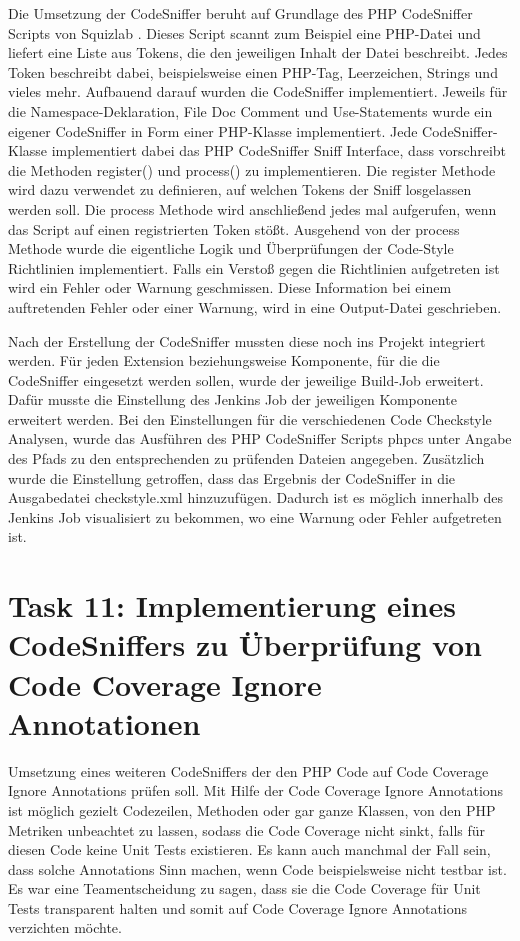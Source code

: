 \documentclass[11pt,a4paper]{article} %
\begin{document}
Die Umsetzung der CodeSniffer beruht auf Grundlage des PHP CodeSniffer Scripts von Squizlab 
\cite{SquizlabPHPCodeSniffer}. Dieses Script scannt zum Beispiel eine PHP-Datei und liefert
eine Liste aus Tokens, die den jeweiligen Inhalt der Datei beschreibt. Jedes Token beschreibt dabei,
beispielsweise einen PHP-Tag, Leerzeichen, Strings und vieles mehr. Aufbauend darauf
wurden die CodeSniffer implementiert. Jeweils für die Namespace-Deklaration, File Doc Comment
und Use-Statements wurde ein eigener CodeSniffer in Form einer PHP-Klasse implementiert.
Jede CodeSniffer-Klasse implementiert dabei das PHP CodeSniffer Sniff Interface, dass vorschreibt
die Methoden register() und process() zu implementieren. Die register Methode wird dazu 
verwendet zu definieren, auf welchen Tokens der Sniff losgelassen werden soll.
Die process Methode wird anschließend jedes mal aufgerufen, wenn das Script auf einen registrierten
Token stößt. Ausgehend von der process Methode wurde die eigentliche Logik und Überprüfungen
der Code-Style Richtlinien implementiert. Falls ein Verstoß gegen die Richtlinien 
aufgetreten ist wird ein Fehler oder Warnung geschmissen.
Diese Information bei einem auftretenden Fehler oder einer Warnung, wird in eine Output-Datei
geschrieben.

Nach der Erstellung der CodeSniffer mussten diese noch ins Projekt integriert werden.
Für jeden Extension beziehungsweise Komponente, für die die CodeSniffer eingesetzt werden sollen,
wurde der jeweilige Build-Job erweitert. Dafür musste die Einstellung des Jenkins Job der jeweiligen 
Komponente erweitert werden. Bei den Einstellungen für die verschiedenen Code Checkstyle Analysen,
wurde das Ausführen des PHP CodeSniffer Scripts phpcs unter Angabe des Pfads zu den entsprechenden zu
prüfenden Dateien angegeben. Zusätzlich wurde die Einstellung getroffen, dass das Ergebnis der CodeSniffer
in die Ausgabedatei checkstyle.xml hinzuzufügen. Dadurch ist es möglich innerhalb des Jenkins Job
visualisiert zu bekommen, wo eine Warnung oder Fehler aufgetreten ist.

\section{Task 11: Implementierung eines CodeSniffers zu Überprüfung von Code Coverage Ignore Annotationen}

Umsetzung eines weiteren CodeSniffers der den PHP Code auf Code Coverage Ignore Annotations prüfen soll.
Mit Hilfe der Code Coverage Ignore Annotations ist möglich gezielt Codezeilen, Methoden oder gar ganze 
Klassen, von den PHP Metriken unbeachtet zu lassen, sodass die Code Coverage nicht sinkt, falls für
diesen Code keine Unit Tests existieren. 
Es kann auch manchmal der Fall sein, dass solche Annotations Sinn machen, wenn Code beispielsweise
nicht testbar ist. Es war eine Teamentscheidung zu sagen, dass sie die Code Coverage für Unit Tests transparent
halten und somit auf Code Coverage Ignore Annotations verzichten möchte.
\end{document}
